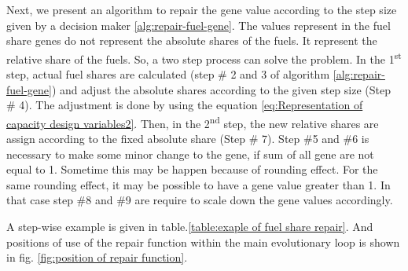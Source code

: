 \documentclass{article}
\begin{document}


Next, we present an algorithm to repair the gene value according to the step size given by a decision maker \ref{alg:repair-fuel-gene}. 
The values represent in the fuel share genes do not represent the absolute shares of the fuels.
It represent the relative share of the fuels.
So, a two step process can solve the problem. 
In the 1\textsuperscript{st} step, actual fuel shares are calculated (step \# 2 and 3 of algorithm \ref{alg:repair-fuel-gene}) and  adjust the absolute shares according to the given step size (Step \# 4). 
The adjustment is done by using the equation \ref{eq:Representation of capacity design variables2}. 
Then, in the 2\textsuperscript{nd} step, the new relative shares are assign according to the fixed absolute share (Step \# 7).
Step \#5 and \#6 is necessary to make some minor change to the gene, if sum of all gene are not equal to 1. 
Sometime this may be happen because of rounding effect. 
For the same rounding effect, it may be possible to have a gene value greater than 1.
In that case step \#8 and \#9 are require to scale down the gene values accordingly.

\begin{algorithm}
  \caption{Repair Function for fuel genes
    \label{alg:repair-fuel-gene}}
  \begin{algorithmic}[1]
%       
	\EndIf
	\EndIf 	    
	 \State {}
    \EndFunction
  \end{algorithmic}
\end{algorithm}

A step-wise example is given in table.\ref{table:exaple of fuel share repair}.
And positions of use of the repair function within the main evolutionary loop is shown in fig. \ref{fig:position of repair function}.
\end{document}
